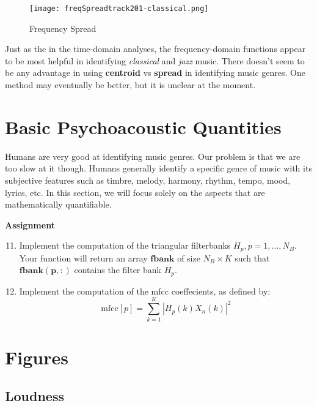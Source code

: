 \documentclass{article} %
\begin{document}
\begin{figure}[H]
\centering
\texttt{[image: freqSpreadtrack201-classical.png]}
\caption{Frequency Spread}
\label{fig:spread201}
\end{figure}

Just as the in the time-domain analyses, the frequency-domain functions appear to be most helpful in identifying \emph{classical} and \emph{jazz} music. 
There doesn't seem to be any advantage in using \textbf{centroid} vs \textbf{spread} in identifying music genres. One method may eventually be better, but it is unclear at the moment. 


\section{Basic Psychoacoustic Quantities}
Humans are very good at identifying music genres. Our problem is that we are too slow at it though. Humans generally identify a specific genre of music with its subjective features
such as timbre, melody, harmony, rhythm, tempo, mood, lyrics, etc. In this section, we will focus solely on the aspects that are mathematically quantifiable. 

\begin{framed}
\textbf{Assignment}
\begin{enumerate}
\setcounter{enumi}{10}
\item Implement the computation of the triangular filterbanks $H_p,p=1,\dots ,N_B$. Your function will return an array $\mathbf{fbank}$ of size $N_B \times K$ such that
$\mathbf{fbank(p,:)}$ contains the filter bank $H_p$. 
\item Implement the computation of the mfcc coeffecients, as defined by:
\begin{equation}
\text{mfcc}[p]=\sum\limits_{k=1}^{K}|H_p(k)X_n(k)|^2
\end{equation}
\end{enumerate}
\end{framed}









\clearpage
\appendix
\section{Figures}
\subsection{Loudness}
\label{sec:LoudnessFigures}
\end{document}
